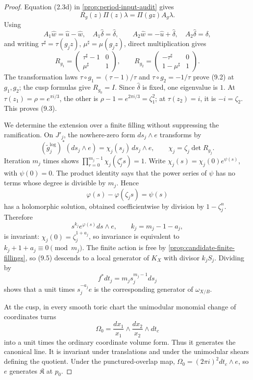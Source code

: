 \begin{proof}
Equation (2.3d) in \cref{prop:period-input-audit} gives
\[
 R_g(z)\Pi(z)\lambda=\Pi(gz)A_g\lambda.
\]
Using
\[
 A_1\widehat w=\widehat u-\widehat w,\quad
 A_1\widehat\delta=\widehat\delta,\qquad
 A_2\widehat w=-\widehat u+\widehat\delta,\quad
 A_2\widehat\delta=\widehat\delta,
\]
and writing \(\tau^\sharp=\tau(g_jz)\),
\(\mu^\sharp=\mu(g_jz)\), direct multiplication gives
\[
 R_{g_1}=
 \begin{pmatrix}\tau^\sharp-1&0\\ \mu^\sharp&1\end{pmatrix},
 \qquad
 R_{g_2}=
 \begin{pmatrix}-\tau^\sharp&0\\1-\mu^\sharp&1\end{pmatrix}.
\]
The transformation laws
\(\tau\circ g_1=(\tau-1)/\tau\) and
\(\tau\circ g_2=-1/\tau\) prove (9.2) at \(g_1,g_2\); the cusp formulas
give \(R_{g_0}=I\).  Since \(\widehat\delta\) is fixed, one eigenvalue is
\(1\).  At \(\tau(z_1)=\rho=e^{\pi i/3}\), the other is
\(\rho-1=e^{2\pi i/3}=\zeta_1^2\); at \(\tau(z_2)=i\), it is
\(-i=\zeta_2\).  This proves (9.3).

We determine the extension over a finite filling without suppressing the
ramification.  On \(J'_j\), the nowhere-zero form \(ds_j\wedge e\)
transforms by
\[
 (\widetilde g_j^{\log})^*(ds_j\wedge e)
 =\chi_j(s_j)\,ds_j\wedge e,
 \qquad \chi_j=\zeta_j\det R_{g_j}.
\tag{9.4}
\]
Iteration \(m_j\) times shows
\(\prod_{r=0}^{m_j-1}\chi_j(\zeta_j^rs)=1\).
Write \(\chi_j(s)=\chi_j(0)e^{\psi(s)}\), with \(\psi(0)=0\).
The product identity says that the power series of \(\psi\) has no terms
whose degree is divisible by \(m_j\).  Hence
\[
 \varphi(s)-\varphi(\zeta_js)=\psi(s)
\]
has a holomorphic solution, obtained coefficientwise by division by
\(1-\zeta_j^n\).  Therefore
\[
 s^{k_j}e^{\varphi(s)}ds\wedge e,
 \qquad k_j=m_j-1-a_j,
\tag{9.5}
\]
is invariant: \(\chi_j(0)=\zeta_j^{1+a_j}\), so invariance is equivalent
to \(k_j+1+a_j\equiv0\pmod {m_j}\).  The finite action is free by
\cref{prop:candidate-finite-fillings}, so (9.5) descends to a local
generator of \(K_X\) with divisor \(k_jS_j\).  Dividing by
\[
 f^*dt_j=m_js_j^{m_j-1}ds_j
\]
shows that a unit times \(s_j^{-a_j}e\) is the corresponding generator of
\(\omega_{X/B}\).

At the cusp, in every smooth toric chart the unimodular monomial change of
coordinates turns
\[
 \Omega_0=\frac{dx_1}{x_1}\wedge
          \frac{dx_2}{x_2}\wedge dt_c
\]
into a unit times the ordinary coordinate volume form.  Thus it generates
the canonical line.  It is invariant under translations and under the
unimodular shears defining the quotient.  Under the punctured-overlap map,
\(\Omega_0=(2\pi i)^2dt_c\wedge e\), so \(e\) generates
\(\mathfrak K\) at \(p_0\).


\end{proof}
